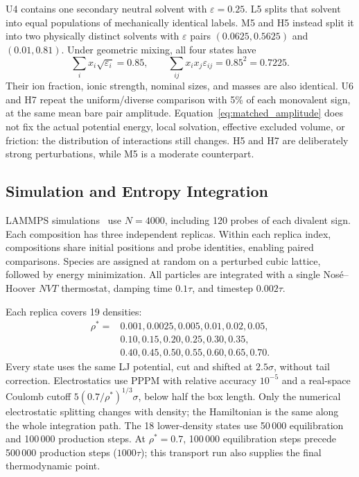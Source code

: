 \documentclass[aps,pre,twocolumn,superscriptaddress,floatfix]{revtex4-2}
\begin{document}
U4 contains one secondary neutral solvent with $\varepsilon=0.25$. L5 splits that solvent into equal populations of mechanically identical labels. M5 and H5 instead split it into two physically distinct solvents with $\varepsilon$ pairs $(0.0625,0.5625)$ and $(0.01,0.81)$. Under geometric mixing, all four states have
\begin{equation}
\sum_i x_i\sqrt{\varepsilon_i}=0.85,\qquad
\sum_{ij}x_ix_j\varepsilon_{ij}=0.85^2=0.7225.
\label{eq:matched_amplitude}
\end{equation}
Their ion fraction, ionic strength, nominal sizes, and masses are also identical. U6 and H7 repeat the uniform/diverse comparison with 5\% of each monovalent sign, at the same mean bare pair amplitude. Equation~\eqref{eq:matched_amplitude} does not fix the actual potential energy, local solvation, effective excluded volume, or friction: the distribution of interactions still changes. H5 and H7 are deliberately strong perturbations, while M5 is a moderate counterpart.

\subsection{Simulation and Entropy Integration}
\label{sec:simulation}

LAMMPS simulations~\cite{Plimpton1995} use $N=4000$, including 120 probes of each divalent sign. Each composition has three independent replicas. Within each replica index, compositions share initial positions and probe identities, enabling paired comparisons. Species are assigned at random on a perturbed cubic lattice, followed by energy minimization. All particles are integrated with a single Nos\'e--Hoover $NVT$ thermostat, damping time $0.1\tau$, and timestep $0.002\tau$.

Each replica covers 19 densities:
\begin{align}
\rho^*={}&0.001,0.0025,0.005,0.01,0.02,0.05,\nonumber\\
&0.10,0.15,0.20,0.25,0.30,0.35,\nonumber\\
&0.40,0.45,0.50,0.55,0.60,0.65,0.70.
\end{align}
Every state uses the same LJ potential, cut and shifted at $2.5\sigma$, without tail correction. Electrostatics use PPPM with relative accuracy $10^{-5}$ and a real-space Coulomb cutoff $5(0.7/\rho^*)^{1/3}\sigma$, below half the box length. Only the numerical electrostatic splitting changes with density; the Hamiltonian is the same along the whole integration path. The 18 lower-density states use 50\,000 equilibration and 100\,000 production steps. At $\rho^*=0.7$, 100\,000 equilibration steps precede 500\,000 production steps ($1000\tau$); this transport run also supplies the final thermodynamic point.
\end{document}
